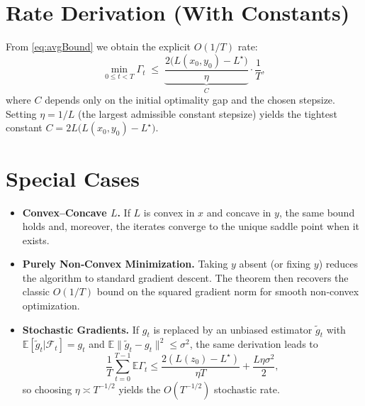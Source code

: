 \documentclass{article}
\newcommand{\E}{\mathbb{E}}
\begin{document}
\section*{Rate Derivation (With Constants)}
From \eqref{eq:avgBound} we obtain the explicit $O(1/T)$ rate:
\[
\min_{0\le t<T}\Gamma_t
\;\le\;
\underbrace{\frac{2\big(L(x_0,y_0)-L^\star\big)}{\eta}}_{\displaystyle C}
\cdot\frac{1}{T},
\]
where $C$ depends only on the initial optimality gap and the chosen stepsize.  Setting $\eta=1/L$ (the largest admissible constant stepsize) yields the tightest constant $C=2L\big(L(x_0,y_0)-L^\star\big)$.

\section*{Special Cases}
\begin{itemize}
\item \textbf{Convex–Concave $L$.} If $L$ is convex in $x$ and concave in $y$, the same bound holds and, moreover, the iterates converge to the unique saddle point when it exists.
\item \textbf{Purely Non‑Convex Minimization.} Taking $y$ absent (or fixing $y$) reduces the algorithm to standard gradient descent.  The theorem then recovers the classic $O(1/T)$ bound on the squared gradient norm for smooth non‑convex optimization.
\item \textbf{Stochastic Gradients.} If $g_t$ is replaced by an unbiased estimator $\tilde g_t$ with $\E[\tilde g_t|\mathcal F_t]=g_t$ and $\E\|\tilde g_t-g_t\|^2\le\sigma^2$, the same derivation leads to 
\[
\frac{1}{T}\sum_{t=0}^{T-1}\E\Gamma_t\le
\frac{2(L(z_0)-L^\star)}{\eta T}+\frac{L\eta\sigma^2}{2},
\]
so choosing $\eta\asymp T^{-1/2}$ yields the $O(T^{-1/2})$ stochastic rate.
\end{itemize}
\end{document}
